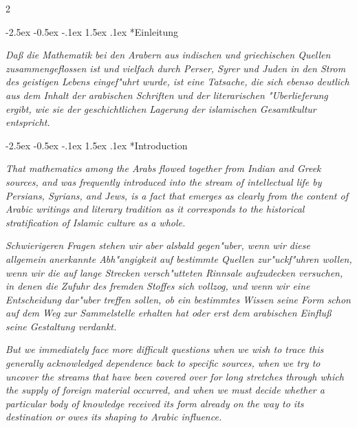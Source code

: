 \documentclass[10pt,a4paper]{article}
\makeatletter
\renewcommand{\section}{\@startsection{section}{1}{\z@}%
  {-2.5ex \@plus -0.5ex \@minus -.1ex}%
  {1.5ex \@plus .1ex}%
  {\normalfont\large\bfseries\color{sectioncolor}}}
\makeatother
\begin{document}
\begin{paracol}{2}

\section*{Einleitung}

\textit{Da\ss{} die Mathematik bei den Arabern aus indischen und griechischen Quellen zusammengeflossen ist und vielfach durch Perser, Syrer und Juden in den Strom des geistigen Lebens eingef"uhrt wurde, ist eine Tatsache, die sich ebenso deutlich aus dem Inhalt der arabischen Schriften und der literarischen "Uberlieferung ergibt, wie sie der geschichtlichen Lagerung der islamischen Gesamtkultur entspricht.}

\switchcolumn

\section*{Introduction}

\textit{That mathematics among the Arabs flowed together from Indian and Greek sources, and was frequently introduced into the stream of intellectual life by Persians, Syrians, and Jews, is a fact that emerges as clearly from the content of Arabic writings and literary tradition as it corresponds to the historical stratification of Islamic culture as a whole.}

\switchcolumn*

\textit{Schwierigeren Fragen stehen wir aber alsbald gegen"uber, wenn wir diese allgemein anerkannte Abh"angigkeit auf bestimmte Quellen zur"uckf"uhren wollen, wenn wir die auf lange Strecken versch"utteten Rinnsale aufzudecken versuchen, in denen die Zufuhr des fremden Stoffes sich vollzog, und wenn wir eine Entscheidung dar"uber treffen sollen, ob ein bestimmtes Wissen seine Form schon auf dem Weg zur Sammelstelle erhalten hat oder erst dem arabischen Einflu\ss{} seine Gestaltung verdankt.}

\switchcolumn

\textit{But we immediately face more difficult questions when we wish to trace this generally acknowledged dependence back to specific sources, when we try to uncover the streams that have been covered over for long stretches through which the supply of foreign material occurred, and when we must decide whether a particular body of knowledge received its form already on the way to its destination or owes its shaping to Arabic influence.}


\end{paracol}
\end{document}
